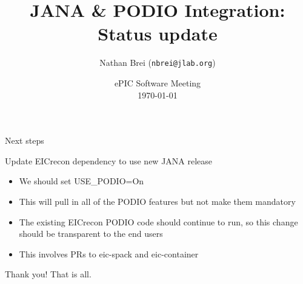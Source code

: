 \documentclass[aspectratio=169]{beamer}
\title{JANA \& PODIO Integration:\\Status update}
\author{Nathan Brei (\texttt{nbrei@jlab.org})}
\date{ePIC Software Meeting\\\today}
\institute{Jefferson Lab}
\begin{document}
\begin{frame}[plain]
    \maketitle
\end{frame}

\begin{frame}{Next steps}
\begin{block}{Update EICrecon dependency to use new JANA release}
\begin{itemize}
    \item We should set USE\_PODIO=On
    \item This will pull in all of the PODIO features but not make them mandatory
    \item The existing EICrecon PODIO code should continue to run, so this change should be transparent to the end users
    \item This involves PRs to eic-spack and eic-container
\end{itemize}
\end{block}
\end{frame}

\begin{frame}[standout]
Thank you! That is all.
\end{frame}
\end{document}
